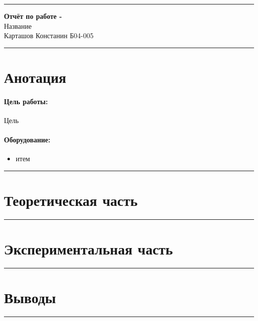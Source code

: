 \documentclass[a4paper,12pt]{article} %
\begin{document}


\hrule 	
\medskip
\begin{raggedright}
{\large \textbf{Отчёт по работе -}}
\\
\medskip
{\Large Название} 
\\
\medskip
{\large Карташов Констанин Б04-005}
\medskip
\hrule
\medskip
\end{raggedright}


\section{Анотация}

\paragraph{Цель работы:} 
Цель

\paragraph{Оборудование:}
\begin{itemize}
\renewcommand{\labelitemi}{$\triangleright$}
\itemsep0em
\item итем
\end{itemize}


\medskip\hrule\medskip

\section{Теоретическая часть}


\medskip\hrule\medskip

\section{Экспериментальная часть}


\medskip\hrule\medskip

\section{Выводы}



\medskip\hrule\medskip
\end{document}
